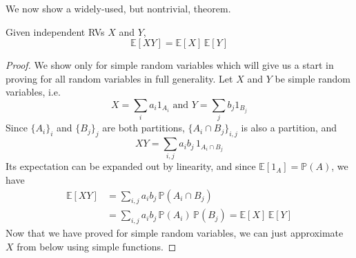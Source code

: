   We now show a widely-used, but nontrivial, theorem. 

  \begin{theorem}
    Given independent RVs $X$ and $Y$, 
    \begin{equation}
      \mathbb{E}[X Y] = \mathbb{E}[X] \, \mathbb{E}[Y]
    \end{equation}
  \end{theorem}
  \begin{proof}
    We show only for simple random variables which will give us a start in proving for all random variables in full generality. Let $X$ and $Y$ be simple random variables, i.e. 
    \begin{equation}
      X = \sum_i a_i 1_{A_i} \text{ and } Y = \sum_j b_j 1_{B_j}
    \end{equation}
    Since $\{A_i\}_i$ and $\{B_j\}_j$ are both partitions, $\{A_i \cap B_j\}_{i, j}$ is also a partition, and 
    \begin{equation}
      X Y = \sum_{i, j} a_i b_j \, 1_{A_i \cap B_j}
    \end{equation}
    Its expectation can be expanded out by linearity, and since $\mathbb{E}[ 1_{A} ] = \mathbb{P}(A)$, we have
    \begin{align*}
      \mathbb{E}[X Y] & = \sum_{i, j} a_i b_j \, \mathbb{P}(A_i \cap B_j) \\
      & = \sum_{i, j} a_i b_j \, \mathbb{P}(A_i)\, \mathbb{P}(B_j) = \mathbb{E}[X] \, \mathbb{E}[Y]
    \end{align*}
    Now that we have proved for simple random variables, we can just approximate $X$ from below using simple functions. 
  \end{proof}

